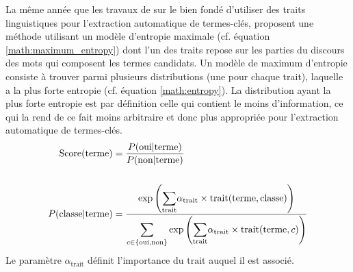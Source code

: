         La même année que les travaux de \citet{hulth2003keywordextraction} sur
        le bien fondé d'utiliser des traits linguistiques pour l'extraction
        automatique de termes-clés, \citet{sujian2003maximumentropy} proposent une
        méthode utilisant un modèle d'entropie maximale (cf. équation
        \ref{math:maximum_entropy}) dont l'un des traits repose sur les parties du
        discours des mots qui composent les termes candidats. Un modèle de maximum
        d'entropie consiste à trouver parmi plusieurs distributions (une pour
        chaque trait), laquelle a la plus forte entropie (cf. équation
        \ref{math:entropy}). La distribution ayant la plus forte entropie est par
        définition celle qui contient le moins d'information, ce qui la rend de ce
        fait moins arbitraire et donc plus appropriée pour l'extraction
        automatique de termes-clés.
        \begin{align}
          \text{Score}(\text{terme}) &= \frac{P(\text{oui} | \text{terme})}{P(\text{non} | \text{terme})} \label{math:maximum_entropy}\\
          \notag\\
          P(\text{classe} | \text{terme}) &= \frac{\exp\left(\mathlarger{\sum}_{\text{trait}} \alpha_{\text{trait}} \times \text{trait}(\text{terme}, \text{classe})\right)}{\mathlarger{\sum}_{c \in \{\text{oui}, \text{non}\}} \exp\left(\mathlarger{\sum}_{\text{trait}} \alpha_{\text{trait}} \times \text{trait}(\text{terme}, c)\right)} \label{math:entropy}
        \end{align}
        Le paramètre $\alpha_{\text{trait}}$ définit l'importance du
        $\text{trait}$ auquel il est associé.

